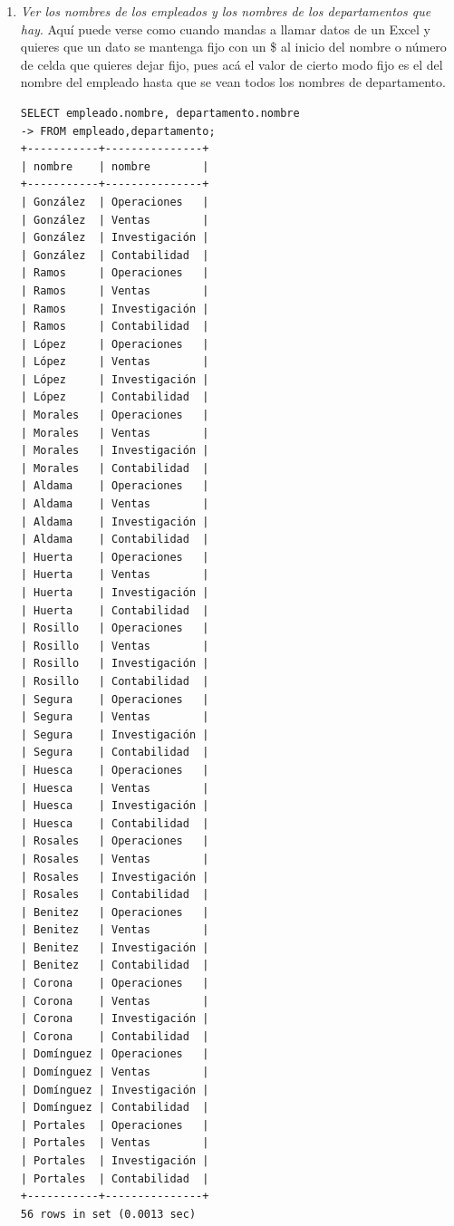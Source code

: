 \documentclass[titlepage,a4paper]{article}
\theoremstyle{definition}
\theoremstyle{remark}
\begin{document}
\begin{enumerate}
    \item \textit{Ver los nombres de los empleados y los nombres de los departamentos que hay}. Aquí puede verse como cuando mandas a llamar datos de un Excel y quieres que un dato se mantenga fijo con un \$ al inicio del nombre o número de celda que quieres dejar fijo, pues acá el valor de cierto modo fijo es el del nombre del empleado hasta que se vean todos los nombres de departamento.
    \begin{lstlisting}
SELECT empleado.nombre, departamento.nombre
-> FROM empleado,departamento;
+-----------+---------------+
| nombre    | nombre        |
+-----------+---------------+
| González  | Operaciones   |
| González  | Ventas        |
| González  | Investigación |
| González  | Contabilidad  |
| Ramos     | Operaciones   |
| Ramos     | Ventas        |
| Ramos     | Investigación |
| Ramos     | Contabilidad  |
| López     | Operaciones   |
| López     | Ventas        |
| López     | Investigación |
| López     | Contabilidad  |
| Morales   | Operaciones   |
| Morales   | Ventas        |
| Morales   | Investigación |
| Morales   | Contabilidad  |
| Aldama    | Operaciones   |
| Aldama    | Ventas        |
| Aldama    | Investigación |
| Aldama    | Contabilidad  |
| Huerta    | Operaciones   |
| Huerta    | Ventas        |
| Huerta    | Investigación |
| Huerta    | Contabilidad  |
| Rosillo   | Operaciones   |
| Rosillo   | Ventas        |
| Rosillo   | Investigación |
| Rosillo   | Contabilidad  |
| Segura    | Operaciones   |
| Segura    | Ventas        |
| Segura    | Investigación |
| Segura    | Contabilidad  |
| Huesca    | Operaciones   |
| Huesca    | Ventas        |
| Huesca    | Investigación |
| Huesca    | Contabilidad  |
| Rosales   | Operaciones   |
| Rosales   | Ventas        |
| Rosales   | Investigación |
| Rosales   | Contabilidad  |
| Benitez   | Operaciones   |
| Benitez   | Ventas        |
| Benitez   | Investigación |
| Benitez   | Contabilidad  |
| Corona    | Operaciones   |
| Corona    | Ventas        |
| Corona    | Investigación |
| Corona    | Contabilidad  |
| Domínguez | Operaciones   |
| Domínguez | Ventas        |
| Domínguez | Investigación |
| Domínguez | Contabilidad  |
| Portales  | Operaciones   |
| Portales  | Ventas        |
| Portales  | Investigación |
| Portales  | Contabilidad  |
+-----------+---------------+
56 rows in set (0.0013 sec)
    \end{lstlisting}



\end{enumerate}
\end{document}
